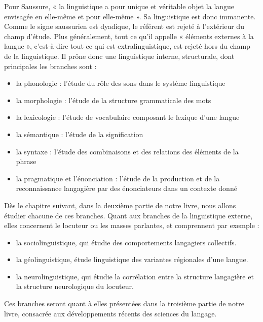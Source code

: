 Pour Saussure, « la linguistique a pour unique et véritable objet la langue envisagée en elle-même et pour elle-même ». Sa linguistique est donc immanente. Comme le signe saussurien est dyadique, le référent est rejeté à l’extérieur du champ d’étude. Plus généralement, tout ce qu’il appelle « éléments externes à la langue », c’est-à-dire tout ce qui est extralinguistique, est rejeté hors du champ de la linguistique. Il prône donc une linguistique interne, structurale, dont principales les branches sont :
\begin{itemize}
\item la phonologie : l’étude du rôle des sons dans le système linguistique
\item la morphologie : l’étude de la structure grammaticale des mots
\item la lexicologie : l’étude de vocabulaire composant le lexique d’une langue
\item la sémantique : l’étude de la signification
\item la syntaxe : l’étude des combinaisons et des relations des éléments de la phrase
\item la pragmatique et l’énonciation : l’étude de la production et de la reconnaissance langagière par des énonciateurs dans un contexte donné
\end{itemize}
Dès le chapitre suivant, dans la deuxième partie de notre livre, nous allons étudier chacune de ces branches. Quant aux branches de la linguistique externe, elles concernent le locuteur ou les masses parlantes, et comprennent par exemple :
\begin{itemize}
\item la sociolinguistique, qui étudie des comportements langagiers collectifs.
\item la géolinguistique, étude linguistique des variantes régionales d’une langue.
\item la neurolinguistique, qui étudie la corrélation entre la structure langagière et la structure neurologique du locuteur.
\end{itemize}
Ces branches seront quant à elles présentées dans la troisième partie de notre livre, consacrée aux développements récents des sciences du langage.

